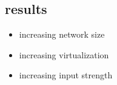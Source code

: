 \subsection{results}
	\begin{itemize}
		\item increasing network size
		\item increasing virtualization
		\item increasing input strength
	\end{itemize}
